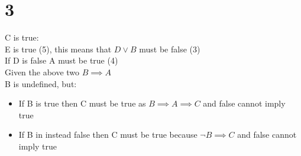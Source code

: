\documentclass{article}
\begin{document}
    \section*{3}
    C is true: \\
    E is true (5), this means that $D \lor B$ must be false (3) \\
    If D is false A must be true (4) \\
    Given the above two $B \implies A$ \\
    B is undefined, but:
    \begin{itemize}
        \item If B is true then C must be true as $B \implies A \implies C$ and false cannot imply true 
        \item If B in instead false then C must be true because $\neg B \implies C$ and false cannot imply true
    \end{itemize}

    
\end{document}
